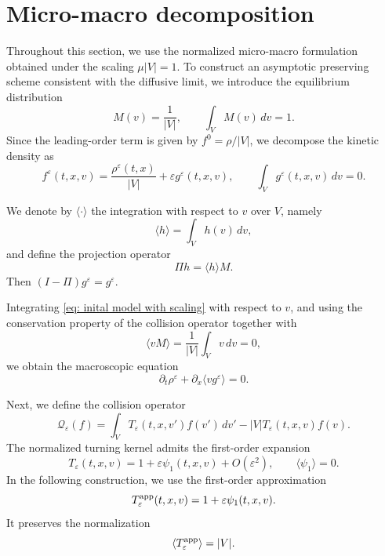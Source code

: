 \documentclass[11pt,twoside]{article}
\numberwithin{equation}{section}
\theoremstyle{plain}
\theoremstyle{nonumberplain}
\begin{document}
{\color{red}
\section{Micro-macro decomposition}
\label{sec: micro macro decomp}

Throughout this section, we use the normalized micro-macro formulation
obtained under the scaling $\mu |V|=1$. 
To construct an asymptotic preserving scheme consistent with the diffusive limit, we introduce the equilibrium distribution
\[
M(v)=\frac1{|V|},
\qquad \int_V M(v)\,dv=1.
\]
Since the leading-order term is given by \(f^0=\rho/|V|\), we decompose the kinetic density as
\begin{equation}\label{f_expansion}
f^\varepsilon(t,x,v)=\frac{\rho^\varepsilon(t,x)}{|V|}+\varepsilon g^\varepsilon(t,x,v),
\qquad
\int_V g^\varepsilon(t,x,v)\,dv=0.
\end{equation}


We denote by \(\langle \cdot \rangle\) the integration with respect to \(v\) over \(V\), namely
\[
\langle h\rangle = \int_V h(v)\,dv,
\]
and define the projection operator
\[
\Pi h = \langle h\rangle M.
\]
Then \((I-\Pi)g^\varepsilon=g^\varepsilon\).

Integrating \eqref{eq: inital model with scaling} with respect to \(v\), and using the conservation property of the collision operator together with
\[
\langle vM\rangle = \frac1{|V|}\int_V v\,dv = 0,
\]
we obtain the macroscopic equation
\[
\partial_t \rho^\varepsilon + \partial_x \langle v g^\varepsilon\rangle = 0.
\]

Next, we define the collision operator
\[
\mathcal{Q}_\varepsilon(f)
=
\int_V T_\varepsilon(t,x,v')f(v')\,dv'
-
|V|T_\varepsilon(t,x,v)f(v).
\]
The normalized turning kernel admits the first-order expansion
\[
T_\varepsilon(t,x,v)
=
1+\varepsilon\psi_1(t,x,v)+O(\varepsilon^2),
\qquad
\langle \psi_1\rangle=0.
\]
In the following construction, we use the first-order approximation
\[
T_\varepsilon^{\rm app}(t,x,v)
=
1+\varepsilon\psi_1(t,x,v).
\]
It preserves the normalization
\[
\langle T_\varepsilon^{\rm app}\rangle=|V|.
\]

}
\end{document}
